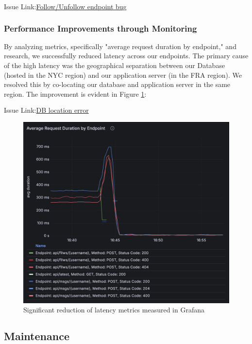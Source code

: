 Issue Link:\href{https://github.com/DevopsGroupC/Minitwit/wiki/Week-11}{\color{blue}Follow/Unfollow endpoint bug}

\subsubsection{Performance Improvements through Monitoring}
By analyzing metrics, specifically "average request duration by endpoint," and research, we successfully reduced latency across our endpoints. The primary cause of the high latency was the geographical separation between our Database (hosted in the NYC region) and our application server (in the FRA region). We resolved this by co-locating our database and application server in the same region. The improvement is evident in Figure \ref{fig:grafana-endpoints-latency}:

Issue Link:\href{https://github.com/DevopsGroupC/Minitwit/wiki/Week-07}{\color{blue}DB location error}

\begin{figure}[H]
\centering
\includegraphics[height=0.9\textwidth]{images/grafana-endpoints-latency.png}
\caption{Significant reduction of latency metrics measured in Grafana}
\label{fig:grafana-endpoints-latency}
\end{figure}

\subsection{Maintenance}
